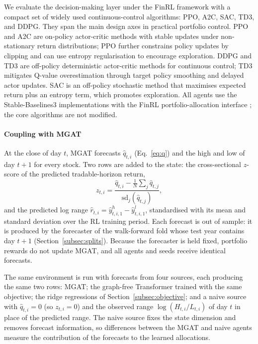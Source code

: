 \documentclass[pdflatex,sn-mathphys-num]{sn-jnl}%
\theoremstyle{thmstyleone}%
\theoremstyle{thmstyletwo}%
\theoremstyle{thmstylethree}%
\begin{document}
We evaluate the decision-making layer under the FinRL framework with a compact set of widely used continuous-control algorithms: PPO\citep{schulman2017ppo}, A2C\citep{mnih2016a3c}, SAC\citep{haarnoja2018sac}, TD3\citep{fujimoto2018td3}, and DDPG\citep{lillicrap2016ddpg}. They span the main design axes in practical portfolio control. PPO and A2C are on-policy actor-critic methods with stable updates under non-stationary return distributions; PPO further constrains policy updates by clipping and can use entropy regularisation to encourage exploration. DDPG and TD3 are off-policy deterministic actor-critic methods for continuous control; TD3 mitigates Q-value overestimation through target policy smoothing and delayed actor updates. SAC is an off-policy stochastic method that maximises expected return plus an entropy term, which promotes exploration. All agents use the Stable-Baselines3 implementations with the FinRL portfolio-allocation interface \citep{Liu2021FinRL}; the core algorithms are not modified.

\paragraph{Coupling with MGAT}
{\color{blue}At the close of day $t$, MGAT forecasts $\hat q_{t,i}$ (Eq.~\eqref{eq:q}) and the high and low of day $t+1$ for every stock. Two rows are added to the state: the cross-sectional $z$-score of the predicted tradable-horizon return,
\begin{equation}
z_{t,i}=\frac{\hat q_{t,i}-\frac1N\sum_{j}\hat q_{t,j}}{\mathrm{sd}_j(\hat q_{t,j})},
\label{eq:zq}
\end{equation}
and the predicted log range $\hat r_{t,i}=\hat y^{h}_{t,i,1}-\hat y^{l}_{t,i,1}$, standardised with its mean and standard deviation over the RL training period. Each forecast is out of sample: it is produced by the forecaster of the walk-forward fold whose test year contains day $t+1$ (Section~\ref{subsec:splits}). Because the forecaster is held fixed, portfolio rewards do not update MGAT, and all agents and seeds receive identical forecasts.

The same environment is run with forecasts from four sources, each producing the same two rows: MGAT; the graph-free Transformer trained with the same objective; the ridge regressions of Section~\ref{subsec:objective}; and a naive source with $\hat q_{t,i}=0$ (so $z_{t,i}=0$) and the observed range $\log(H_{t,i}/L_{t,i})$ of day $t$ in place of the predicted range. The naive source fixes the state dimension and removes forecast information, so differences between the MGAT and naive agents measure the contribution of the forecasts to the learned allocations.\par}
\end{document}
